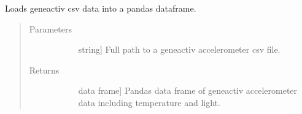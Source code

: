 \documentclass[letterpaper,10pt,english]{sphinxmanual}
\begin{document}
\begin{fulllineitems}
\label{\detokenize{index:sleeppy.utils.load_geneactiv_csv}}
Loads geneactiv csv data into a pandas dataframe.
\begin{quote}\begin{description}
\item[{Parameters}] \leavevmode\begin{description}
\item[{}] \leavevmode{[}string{]}
Full path to a geneactiv accelerometer csv file.

\end{description}

\item[{Returns}] \leavevmode\begin{description}
\item[{}] \leavevmode{[}data frame{]}
Pandas data frame of geneactiv accelerometer data including temperature and light.

\end{description}

\end{description}\end{quote}

\end{fulllineitems}

\end{document}
